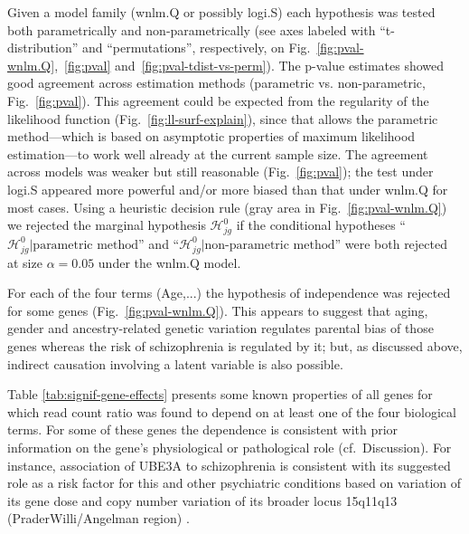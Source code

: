 \documentclass[letterpaper]{article}
\begin{document}
Given a model family (wnlm.Q or possibly logi.S) each hypothesis was tested both parametrically
and non-parametrically (see axes labeled with ``t-distribution'' and
``permutations'', respectively,
on Fig.~\ref{fig:pval-wnlm.Q},~\ref{fig:pval} and~\ref{fig:pval-tdist-vs-perm}). The p-value estimates showed good agreement across estimation methods
(parametric vs. non-parametric, Fig.~\ref{fig:pval}). This agreement could be expected from the regularity
of the likelihood function (Fig.~\ref{fig:ll-surf-explain}), since that allows
the parametric method---which is based
on asymptotic properties of maximum likelihood estimation---to work well already at the current
sample size. The agreement across models was weaker but still reasonable (Fig.~\ref{fig:pval}); the test
under logi.S appeared more powerful and/or more biased than that under wnlm.Q for most cases. Using a
heuristic decision rule (gray area in Fig.~\ref{fig:pval-wnlm.Q}) we rejected
the marginal hypothesis \(\mathcal{H}^0_{jg}\) if the conditional
hypotheses ``\(\mathcal{H}^0_{jg} |\text{parametric method}\)'' and
``\(\mathcal{H}^0_{jg} |\text{non-parametric method}\)'' were both rejected at size
\(\alpha = 0.05\) under the wnlm.Q model.

For each of the four terms (Age,...) the hypothesis of independence was rejected for some genes
(Fig.~\ref{fig:pval-wnlm.Q}). This appears to suggest that aging, gender and ancestry-related genetic variation regulates
parental bias of those genes whereas the risk of schizophrenia is regulated by it; but, as discussed
above, indirect causation involving a latent variable is also possible.

\begin{table}
\footnotesize

\caption{}
\label{tab:signif-gene-effects}
\end{table}

Table \ref{tab:signif-gene-effects} presents some known properties of all genes for which read count ratio was found
to depend on at least one of the four biological terms. For some of these genes the dependence
is consistent with prior information on the gene's physiological or pathological role (cf.~Discussion).
For instance, association of
UBE3A to schizophrenia is consistent with its suggested role as a risk factor for this and other
psychiatric conditions based on variation of its gene dose and copy number variation of its broader
locus 15q11q13 (PraderWilli/Angelman region) \cite{Sullivan2012, McNamara2013}.
\end{document}
